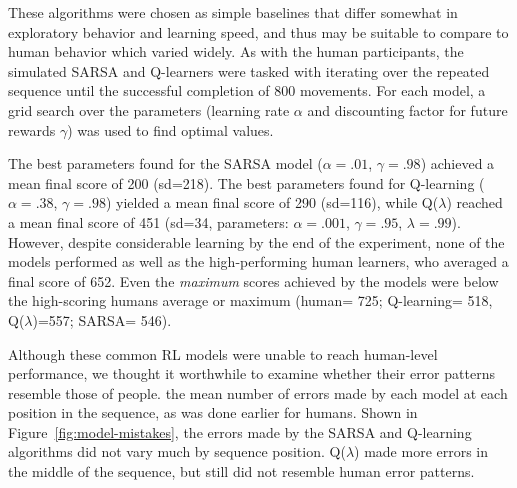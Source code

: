 \documentclass[man,floatsintext]{apa6}
\begin{document}
These algorithms were chosen as simple baselines that differ somewhat in exploratory behavior and learning speed, and thus may be suitable to compare to human behavior which varied widely. As with the human participants, the simulated SARSA and Q-learners were tasked with iterating over the repeated sequence until the successful completion of 800 movements. For each model, a grid search over the parameters (learning rate $\alpha$ and discounting factor for future rewards $\gamma$) was used to find optimal values.

The best parameters found for the SARSA model ($\alpha=.01$, $\gamma=.98$) achieved a mean final score of 200 (sd=218). The best parameters found for Q-learning ($\alpha=.38$, $\gamma=.98$) yielded a mean final score of 290 (sd=116), while Q($\lambda$) reached a mean final score of 451 (sd=34, parameters: $\alpha=.001$, $\gamma=.95$, $\lambda=.99$). However, despite considerable learning by the end of the experiment, none of the models performed as well as the high-performing human learners, who averaged a final score of 652. Even the \emph{maximum} scores achieved by the models were below the high-scoring humans average or maximum (human= 725; Q-learning= 518, Q($\lambda$)=557; SARSA= 546). 

Although these common RL models were unable to reach human-level performance, we thought it worthwhile to examine whether their error patterns resemble those of people. the mean number of errors made by each model at each position in the sequence, as was done earlier for humans. Shown in Figure~\ref{fig:model-mistakes}, the errors made by the SARSA and Q-learning algorithms did not vary much by sequence position. Q($\lambda$) made more errors in the middle of the sequence, but still did not resemble human error patterns.
\end{document}
